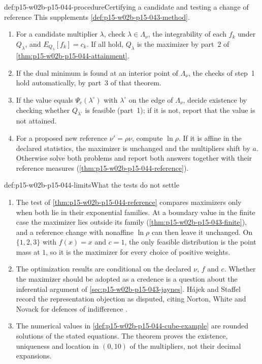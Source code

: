 \begin{hbmethod}{def:p15-w02b-p15-044-procedure}{Certifying a candidate and testing a change of reference}
This supplements \cref{def:p15-w02b-p15-043-method}.
\begin{enumerate}
\item For a candidate multiplier \(\lambda\), check
\(\lambda\in\Lambda_\nu\), the integrability of each \(f_k\) under
\(Q_\lambda\), and \(E_{Q_\lambda}[f_k]=c_k\). If all hold, \(Q_\lambda\)
is the maximizer by part~2 of \cref{thm:p15-w02b-p15-044-attainment}.
\item If the dual minimum is found at an interior point of
\(\Lambda_\nu\), the checks of step~1 hold automatically, by part~3 of
that theorem.
\item If the value equals \(\Psi_c(\lambda^\circ)\) with \(\lambda^\circ\)
on the edge of \(\Lambda_\nu\), decide existence by checking whether
\(Q_{\lambda^\circ}\) is feasible (part~1); if it is not, report that the
value is not attained.
\item For a proposed new reference \(\nu'=\rho\nu\), compute \(\ln\rho\).
If it is affine in the declared statistics, the maximizer is unchanged and
the multipliers shift by \(a\). Otherwise solve both problems and report
both answers together with their reference measures
(\cref{thm:p15-w02b-p15-044-reference}).
\end{enumerate}
\end{hbmethod}

\begin{hbwarning}{def:p15-w02b-p15-044-limits}{What the tests do not settle}
\begin{enumerate}
\item The test of \cref{thm:p15-w02b-p15-044-reference} compares
maximizers only when both lie in their exponential families. At a boundary
value in the finite case the maximizer lies outside its family
(\cref{thm:p15-w02b-p15-043-finite}), and a reference change with
nonaffine \(\ln\rho\) can then leave it unchanged. On \(\{1,2,3\}\) with
\(f(x)=x\) and \(c=1\), the only feasible distribution is the point mass
at \(1\), so it is the maximizer for every choice of positive weights.
\item The optimization results are conditional on the declared \(\nu\),
\(f\) and \(c\). Whether the maximizer should be adopted as a credence is
a question about the inferential argument of
\cref{sec:p15-w02b-p15-043-jaynes}. H\'ajek and Staffel record the
representation objection as disputed, citing Norton, White and Novack
for defences of indifference \cite[p.~244]{HajekStaffel2021Dynamics}.
\item The numerical values in \cref{def:p15-w02b-p15-044-cube-example}
are rounded solutions of the stated equations. The theorem proves the
existence, uniqueness and location in \((0,10)\) of the multipliers, not
their decimal expansions.
\end{enumerate}
\end{hbwarning}

